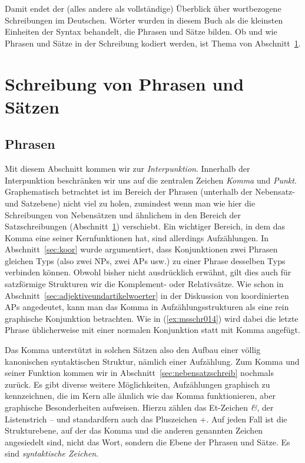 Damit endet der (alles andere als vollständige) Überblick über wortbezogene Schreibungen im Deutschen.
Wörter wurden in diesem Buch als die kleinsten Einheiten der Syntax behandelt, die Phrasen und Sätze bilden.
Ob und wie Phrasen und Sätze in der Schreibung kodiert werden, ist Thema von Abschnitt~\ref{sec:satzschreib}.

\section{Schreibung von Phrasen und Sätzen}

\label{sec:satzschreib}

\subsection{Phrasen}

\label{sec:phrasenschrift}
\label{sec:koordinschreib}

Mit diesem Abschnitt kommen wir zur \textit{Interpunktion}.
Innerhalb der Interpunktion beschränken wir uns auf die zentralen Zeichen \textit{Komma} und \textit{Punkt}.
Graphematisch betrachtet ist im Bereich der Phrasen (unterhalb der Nebensatz- und Satzebene) nicht viel zu holen, zumindest wenn man wie hier die Schreibungen von Nebensätzen und ähnlichem in den Bereich der Satzschreibungen (Abschnitt~\ref{sec:satzschreib}) verschiebt.
Ein wichtiger Bereich, in dem das Komma eine seiner Kernfunktionen hat, sind allerdings Aufzählungen.
In Abschnitt~\ref{sec:koor} wurde argumentiert, dass Konjunktionen zwei Phrasen gleichen Typs (also zwei NPs, zwei APs usw.) zu einer Phrase desselben Typs verbinden können.
Obwohl bisher nicht ausdrücklich erwähnt, gilt dies auch für satzförmige Strukturen wir die Komplement- oder Relativsätze.
Wie schon in Abschnitt~\ref{sec:adjektiveundartikelwoerter} in der Diskussion von koordinierten APs angedeutet, kann man das Komma in Aufzählungsstrukturen als eine rein graphische Konjunktion betrachten.
Wie in (\ref{ex:msschr014}) wird dabei die letzte Phrase üblicherweise mit einer normalen Konjunktion statt mit Komma angefügt.

\begin{exe}
\end{exe}

Das Komma unterstützt in solchen Sätzen also den Aufbau einer völlig kanonischen syntaktischen Struktur, nämlich einer Aufzählung.
Zum Komma und seiner Funktion kommen wir in Abschnitt~\ref{sec:nebensatzschreib} nochmals zurück.
Es gibt diverse weitere Möglichkeiten, Aufzählungen graphisch zu kennzeichnen, die im Kern alle ähnlich wie das Komma funktionieren, aber graphische Besonderheiten aufweisen.
Hierzu zählen das Et-Zeichen \textit{\&}, der Listenstrich -- und standardfern auch das Pluszeichen $+$.
Auf jeden Fall ist die Strukturebene, auf der das Komma und die anderen genannten Zeichen angesiedelt sind, nicht das Wort, sondern die Ebene der Phrasen und Sätze.
Es sind \textit{syntaktische Zeichen}.

